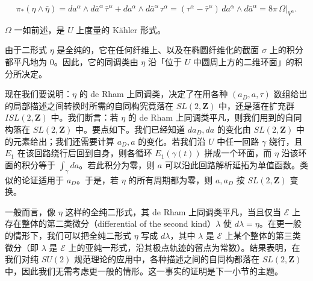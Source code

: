 \[
  \pi_*(\eta\wedge\bar\eta)
  =da^\alpha\wedge d\bar a^\alpha\,\bar\tau^\alpha
   +da^\alpha\wedge d\bar a^\alpha\,\tau^\alpha
  =(\tau^\alpha-\bar\tau^\alpha)\,da^\alpha\wedge d\bar a^\alpha
  =8\pi\,\Omega|_{V^\alpha}.
\]


$\Omega$ 一如前述，是 $U$ 上度量的 Kähler 形式。

由于二形式 $\eta$ 是全纯的，它在任何纤维上、以及在椭圆纤维化的截面 $\sigma$ 上的积分都平凡地为 $0$。因此，它的同调类由 $\eta$ 沿「位于 $U$ 中圆周上方的二维环面」的积分所决定。

现在我们要说明：$\eta$ 的 de Rham 上同调类，决定了在用各种 $(a_D,a,\tau)$ 数组给出的局部描述之间转换时所需的自同构究竟落在 $SL(2,\mathbf{Z})$ 中，还是落在扩充群 $ISL(2,\mathbf{Z})$ 中。我们断言：若 $\eta$ 的 de Rham 上同调类平凡，则我们用到的自同构落在 $SL(2,\mathbf{Z})$ 中。要点如下。我们已经知道 $da_D,da$ 的变化由 $SL(2,\mathbf{Z})$ 中的元素给出；我们还需要计算 $a_D,a$ 的变化。若我们沿 $U$ 中任一回路 $\gamma$ 绕行，且 $E_1$ 在该回路绕行后回到自身，则各循环 $E_1(\gamma(t))$ 拼成一个环面，而 $\eta$ 沿该环面的积分等于 $\int_\gamma da$。若此积分为零，则 $a$ 可以沿此回路解析延拓为单值函数。类似的论证适用于 $a_D$。于是，若 $\eta$ 的所有周期都为零，则 $a,a_D$ 按 $SL(2,\mathbf{Z})$ 变换。

一般而言，像 $\eta$ 这样的全纯二形式，其 de Rham 上同调类平凡，当且仅当 $\mathcal{E}$ 上存在整体的第二类微分（differential of the second kind）$\lambda$ 使 $d\lambda=\eta$。在更一般的情形下，我们可以把全纯二形式 $\eta$ 写成 $d\lambda$，其中 $\lambda$ 是 $\mathcal{E}$ 上某个整体的第三类微分（即 $\lambda$ 是 $\mathcal{E}$ 上的亚纯一形式，沿其极点轨迹的留点为常数）。结果表明，在我们对纯 $SU(2)$ 规范理论的应用中，各种描述之间的自同构都落在 $SL(2,\mathbf{Z})$ 中，因此我们无需考虑更一般的情形。这一事实的证明是下一小节的主题。

